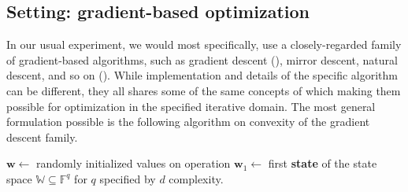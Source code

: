 \subsection{Setting: gradient-based optimization}

In our usual experiment, we would most specifically, use a closely-regarded family of gradient-based algorithms, such as gradient descent (\cite{Cauchy:1847,Robbins:1951,Widrow:1960,Hestenes:1952,Fletcher:1964}), mirror descent, natural descent, and so on (\cite{nemirovski_yudin_1983,amari_1996_natural_riemannian_gradient,amari_1998_natural_gradient_works,yang_amari_1998_complexity_issues_natural_gradient,amari_rattray_saad_1998_natural_gradient_online,gunasekar_woodworth_srebro_2021_mirrorless_mirror_descent,luong_parpas_rueckert_rustem_2016_weighted_mirror_descent,xiao_zhang_2014_proximal_stochastic_gradient,sohl-dickstein_2012_natural_gradient_whitening,raskutti_mukherjee_2013_information_geometry_mirror_descent}). While implementation and details of the specific algorithm can be different, they all shares some of the same concepts of which making them possible for optimization in the specified iterative domain. The most general formulation possible is the following algorithm on convexity of the gradient descent family. 
\begin{algorithm}[htb]
    \caption{Gradient descent on general (convex) function}
    \Begin
    {
    $\mathbf{w}\gets$ randomly initialized values on operation\;
    $\mathbf{w}_{1}\gets$ first \textbf{state} of the state space $\mathbb{W}\subseteq \mathbb{F}^{q}$ for $q$ specified by $d$ complexity.\;
    }
    \label{algo:algo_gd}
\end{algorithm}

